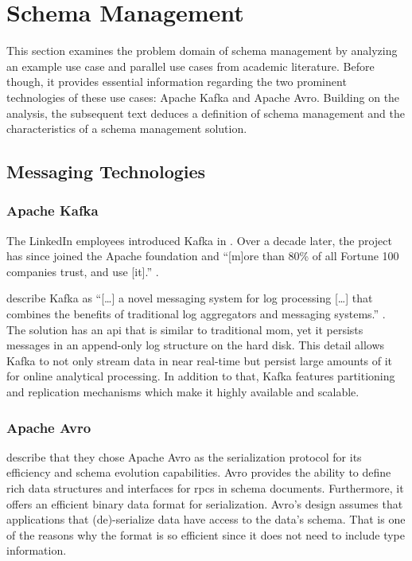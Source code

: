 
\section{Schema Management}\label{sec:schema-management}

This section examines the problem domain of schema management by analyzing an example use case and parallel use cases from academic literature.
Before though, it provides essential information regarding the two prominent technologies of these use cases: Apache Kafka and Apache Avro.
Building on the analysis, the subsequent text deduces a definition of schema management and the characteristics of a schema management solution.

\subsection{Messaging Technologies}

\subsubsection{Apache Kafka}

The LinkedIn employees \citeauthor{kreps_kafka_2011} introduced Kafka in \citeyear{kreps_kafka_2011}.
Over a decade later, the project has since joined the Apache foundation and \enquote{[m]ore than 80\% of all Fortune 100 companies trust, and use [it].} \parencite{noauthor_apache_nodate}.

\citeauthor{kreps_kafka_2011} describe Kafka as \enquote{[\ldots] a novel messaging system for log processing [\ldots] that combines the benefits of traditional log aggregators and messaging systems.} \parencite{kreps_kafka_2011}.
The solution has an \gls{api} that is similar to traditional \gls{mom}, yet it persists messages in an append-only log structure on the hard disk.
This detail allows Kafka to not only stream data in near real-time but persist large amounts of it for online analytical processing.
In addition to that, Kafka features partitioning and replication mechanisms which make it highly available and scalable. \parencite{kreps_kafka_2011}

\subsubsection{Apache Avro}

\citeauthor{kreps_kafka_2011} describe that they chose Apache Avro as the serialization protocol for its efficiency and schema evolution capabilities. 
Avro provides the ability to define rich data structures and interfaces for \glspl{rpc} in schema documents.
Furthermore, it offers an efficient binary data format for serialization.
Avro's design assumes that applications that (de)-serialize data have access to the data's schema.
That is one of the reasons why the format is so efficient since it does not need to include type information.


